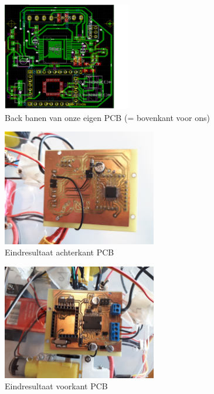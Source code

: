 \begin{figure}[h]
\centering
\includegraphics[width=0.5\textwidth]{Back.png}
\caption{Back banen van onze eigen PCB (= bovenkant voor ons)}
\label{fig:back}
\end{figure}

\begin{figure}[h]
\centering
\includegraphics[width=0.6\textwidth]{AchterkantPCB.png}
\caption{Eindresultaat achterkant PCB}
\label{fig:achterkantPCB}
\end{figure}

\begin{figure}[h]
\centering
\includegraphics[width=0.6\textwidth]{VoorkantPCB.png}
\caption{Eindresultaat voorkant PCB}
\label{fig:voorkantPCB}
\end{figure}

